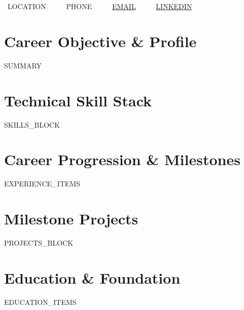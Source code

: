 \documentclass[10pt,letterpaper]{article}
\begin{document}
\begin{center}
  {\Huge \textbf{}} \\[3pt]
  {\normalsize \textbf{}} \\[5pt]
  \small
  \faMapMarker* \ {{LOCATION}} \ \ \textbar\ \ 
  \faPhone \ {{PHONE}} \ \ \textbar\ \ 
  \faEnvelope \ \href{mailto:{{EMAIL}}}{{{EMAIL}}} \ \ \textbar\ \ 
  \faLinkedin \ \href{https://{{LINKEDIN}}}{{{LINKEDIN}}}
\end{center}

\vspace{-2pt}

\section{Career Objective \& Profile}
\small
{{SUMMARY}}

\section{Technical Skill Stack}
\small
{{SKILLS_BLOCK}}

\section{Career Progression \& Milestones}
\small
{{EXPERIENCE_ITEMS}}

\section{Milestone Projects}
\small
{{PROJECTS_BLOCK}}

\section{Education \& Foundation}
\small
{{EDUCATION_ITEMS}}
\end{document}
